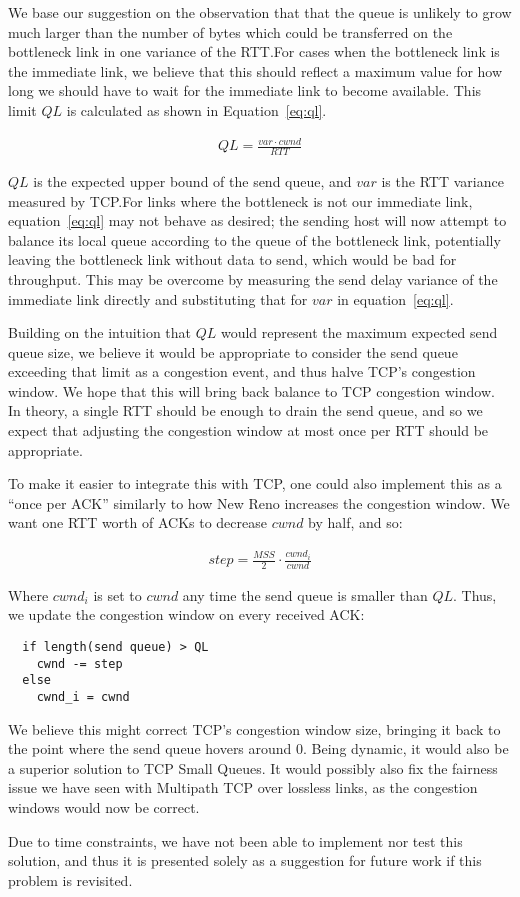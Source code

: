 We base our suggestion on the observation that that the queue is unlikely to
grow much larger than the number of bytes which could be transferred on the
bottleneck link in one variance of the RTT.\@ For cases when the bottleneck link
is the immediate link, we believe that this should reflect a maximum value for
how long we should have to wait for the immediate link to become available. This
limit $QL$ is calculated as shown in Equation~\ref{eq:ql}.

\begin{align}
  QL = \frac{var \cdot cwnd}{RTT}\label{eq:ql}
\end{align}

$QL$ is the expected upper bound of the send queue, and $var$ is the RTT
variance measured by TCP.\@ For links where the bottleneck is not our immediate
link, equation~\ref{eq:ql} may not behave as desired; the sending host will now
attempt to balance its local queue according to the queue of the bottleneck
link, potentially leaving the bottleneck link without data to send, which would
be bad for throughput. This may be overcome by measuring the send delay variance
of the immediate link directly and substituting that for $var$ in
equation~\ref{eq:ql}.

Building on the intuition that $QL$ would represent the maximum expected send
queue size, we believe it would be appropriate to consider the send queue
exceeding that limit as a congestion event, and thus halve TCP's congestion
window. We hope that this will bring back balance to TCP congestion window.  In
theory, a single RTT should be enough to drain the send queue, and so we expect
that adjusting the congestion window at most once per RTT should be appropriate.

To make it easier to integrate this with TCP, one could also implement this as a
``once per ACK'' similarly to how New Reno increases the congestion window. We
want one RTT worth of ACKs to decrease $cwnd$ by half, and so:

\begin{align*}
  step = \frac{MSS}{2} \cdot \frac{cwnd_i}{cwnd}
\end{align*}

Where $cwnd_i$ is set to $cwnd$ any time the send queue is smaller than $QL$.
Thus, we update the congestion window on every received ACK:

\begin{verbatim}
  if length(send queue) > QL
    cwnd -= step
  else
    cwnd_i = cwnd
\end{verbatim}

We believe this might correct TCP's congestion window size, bringing it back to
the point where the send queue hovers around 0. Being dynamic, it would also be
a superior solution to TCP Small Queues. It would possibly also fix the fairness
issue we have seen with Multipath TCP over lossless links, as the congestion
windows would now be correct.

Due to time constraints, we have not been able to implement nor test this
solution, and thus it is presented solely as a suggestion for future work if
this problem is revisited.
